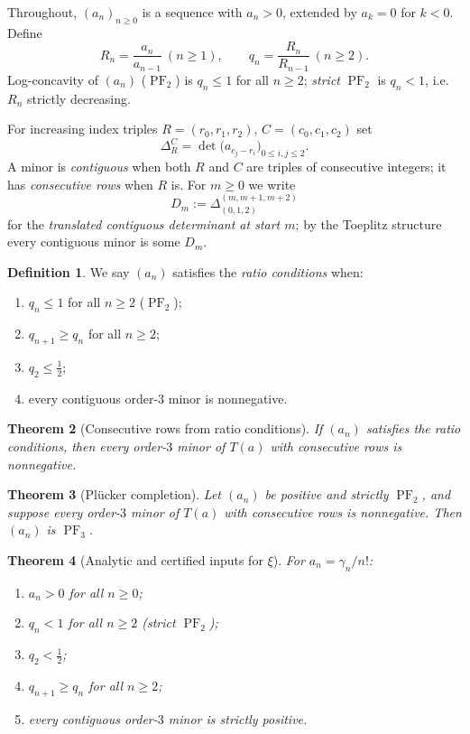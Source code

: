 \documentclass[11pt]{amsart}
\newtheorem{theorem}{Theorem}[section]
\theoremstyle{definition}
\newtheorem{definition}[theorem]{Definition}
\theoremstyle{remark}
\DeclareMathOperator{\PF}{PF}
\newcommand{\minor}[2]{\Delta_{#1}^{#2}}
\begin{document}
Throughout, $(a_n)_{n\ge 0}$ is a sequence with $a_n>0$, extended by
$a_k=0$ for $k<0$. Define
\begin{equation}\label{eq:ratios}
R_n=\frac{a_n}{a_{n-1}}\ (n\ge 1),
\qquad
q_n=\frac{R_n}{R_{n-1}}\ (n\ge 2).
\end{equation}
Log-concavity of $(a_n)$ ($\PF_2$) is $q_n\le 1$ for all $n\ge2$;
\emph{strict} $\PF_2$ is $q_n<1$, i.e.\ $R_n$ strictly decreasing.

For increasing index triples $R=(r_0,r_1,r_2)$, $C=(c_0,c_1,c_2)$ set
\[
\minor{R}{C}=\det\bigl(a_{c_j-r_i}\bigr)_{0\le i,j\le 2}.
\]
A minor is \emph{contiguous} when both $R$ and $C$ are triples of
consecutive integers; it has \emph{consecutive rows} when $R$ is. For
$m\ge 0$ we write
\[
D_m:=\minor{(0,1,2)}{(m,m+1,m+2)}
\]
for the \emph{translated contiguous determinant at start $m$}; by the
Toeplitz structure every contiguous minor is some $D_m$.

\begin{definition}\label{def:ratio-conditions}
We say $(a_n)$ satisfies the \emph{ratio conditions} when:
\begin{enumerate}
\item[(R1)] $q_n\le 1$ for all $n\ge 2$ \hfill($\PF_2$);
\item[(R2)] $q_{n+1}\ge q_n$ for all $n\ge 2$;
\item[(R3)] $q_2\le \tfrac12$;
\item[(R4)] every contiguous order-$3$ minor is nonnegative.
\end{enumerate}
\end{definition}

\begin{theorem}[Consecutive rows from ratio conditions]\label{thm:consec}
If $(a_n)$ satisfies the ratio conditions, then every order-$3$ minor
of $T(a)$ with consecutive rows is nonnegative.
\end{theorem}

\begin{theorem}[Pl\"ucker completion]\label{thm:plucker}
Let $(a_n)$ be positive and strictly $\PF_2$, and suppose every
order-$3$ minor of $T(a)$ with consecutive rows is nonnegative. Then
$(a_n)$ is $\PF_3$.
\end{theorem}

\begin{theorem}[Analytic and certified inputs for $\xi$]\label{thm:inputs}
For $a_n=\gamma_n/n!$:
\begin{enumerate}
\item[(i)] $a_n>0$ for all $n\ge0$;
\item[(ii)] $q_n<1$ for all $n\ge 2$ (strict $\PF_2$);
\item[(iii)] $q_2<\tfrac12$;
\item[(iv)] $q_{n+1}\ge q_n$ for all $n\ge2$;
\item[(v)] every contiguous order-$3$ minor is strictly positive.
\end{enumerate}
\end{theorem}
\end{document}
